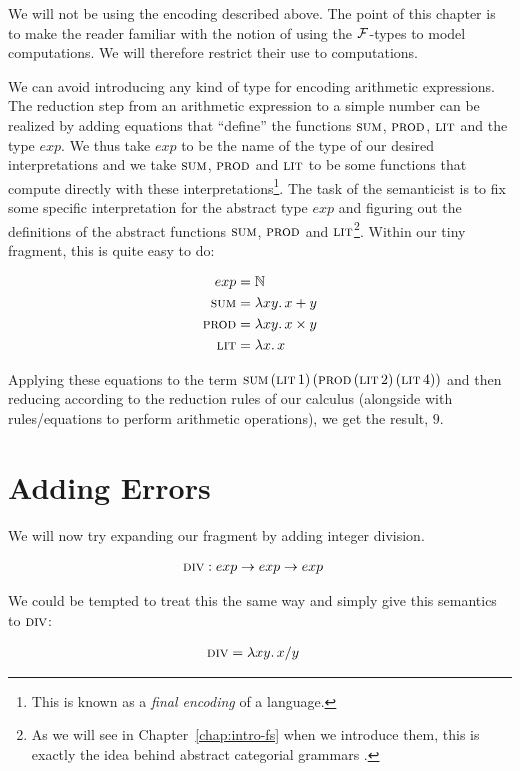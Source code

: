 We will not be using the encoding described above. The point of this
chapter is to make the reader familiar with the notion of using the
$\mathcal{F}$-types to model computations. We will therefore restrict their use to
computations.

We can avoid introducing any kind of type for encoding arithmetic
expressions. The reduction step from an arithmetic expression to a simple
number can be realized by adding equations that ``define'' the functions
$\textsc{sum}$, $\textsc{prod}$, $\textsc{lit}$ and the type $exp$. We thus take $exp$ to be the
name of the type of our desired interpretations and we take $\textsc{sum}$,
$\textsc{prod}$ and $\textsc{lit}$ to be some functions that compute directly with these
interpretations\footnote{This is known as a \emph{final encoding} of a
  language.}. The task of the semanticist is to fix some specific
interpretation for the abstract type $exp$ and figuring out the definitions
of the abstract functions $\textsc{sum}$, $\textsc{prod}$ and $\textsc{lit}$\footnote{As we will
  see in Chapter~\ref{chap:intro-fs} when we introduce them, this is
  exactly the idea behind abstract categorial grammars
  \cite{de2001towards}.}. Within our tiny fragment, this is quite easy to
do:

\begin{align*}
  exp &= \mathbb{N} \\
  \textsc{sum} &= \lambda x y.\, x + y \\
  \textsc{prod} &= \lambda x y.\, x \times y \\
  \textsc{lit} &= \lambda x.\, x
\end{align*}

Applying these equations to the term
$\textsc{sum}\,(\textsc{lit}\,1)\,(\textsc{prod}\,(\textsc{lit}\,2)\,(\textsc{lit}\,4))$
and then reducing according to the reduction rules of our calculus
(alongside with rules/equations to perform arithmetic operations), we get
the result, $9$.


\section{Adding Errors}

We will now try expanding our fragment by adding integer division.

\begin{align*}
  \textsc{div} &: exp \to exp \to exp
\end{align*}

We could be tempted to treat this the same way and simply give this
semantics to $\textsc{div}$:

\begin{align*}
  \textsc{div} &= \lambda x y.\, x / y
\end{align*}


